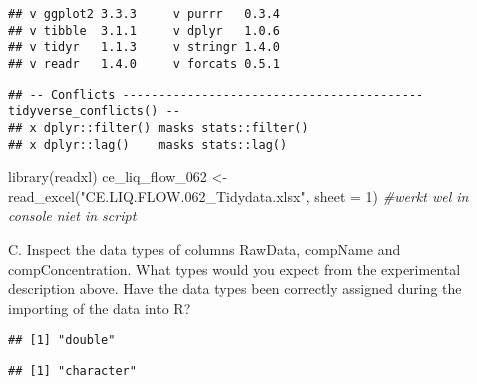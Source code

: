 \documentclass[
]{book}
\newenvironment{Shaded}{\begin{snugshade}}{\end{snugshade}}
\newcommand{\AttributeTok}[1]{\textcolor[rgb]{0.77,0.63,0.00}{#1}}
\newcommand{\CommentTok}[1]{\textcolor[rgb]{0.56,0.35,0.01}{\textit{#1}}}
\newcommand{\DecValTok}[1]{\textcolor[rgb]{0.00,0.00,0.81}{#1}}
\newcommand{\FunctionTok}[1]{\textcolor[rgb]{0.00,0.00,0.00}{#1}}
\newcommand{\NormalTok}[1]{#1}
\newcommand{\OtherTok}[1]{\textcolor[rgb]{0.56,0.35,0.01}{#1}}
\newcommand{\SpecialCharTok}[1]{\textcolor[rgb]{0.00,0.00,0.00}{#1}}
\newcommand{\StringTok}[1]{\textcolor[rgb]{0.31,0.60,0.02}{#1}}
\begin{document}
\begin{verbatim}
## v ggplot2 3.3.3     v purrr   0.3.4
## v tibble  3.1.1     v dplyr   1.0.6
## v tidyr   1.1.3     v stringr 1.4.0
## v readr   1.4.0     v forcats 0.5.1
\end{verbatim}

\begin{verbatim}
## -- Conflicts ------------------------------------------ tidyverse_conflicts() --
## x dplyr::filter() masks stats::filter()
## x dplyr::lag()    masks stats::lag()
\end{verbatim}

\begin{Shaded}
\begin{Highlighting}[]
\FunctionTok{library}\NormalTok{(readxl)}
\NormalTok{ce\_liq\_flow\_062 }\OtherTok{\textless{}{-}} \FunctionTok{read\_excel}\NormalTok{(}\StringTok{"CE.LIQ.FLOW.062\_Tidydata.xlsx"}\NormalTok{, }\AttributeTok{sheet =} \DecValTok{1}\NormalTok{)}
\CommentTok{\#werkt wel in console niet in script}
\end{Highlighting}
\end{Shaded}

C. Inspect the data types of columns RawData, compName and compConcentration. What types would you expect from the experimental description above. Have the data types been correctly assigned during the importing of the data into R?

\begin{Shaded}
\end{Shaded}

\begin{verbatim}
## [1] "double"
\end{verbatim}

\begin{Shaded}
\end{Shaded}

\begin{verbatim}
## [1] "character"
\end{verbatim}

\begin{Shaded}
\end{Shaded}
\end{document}
